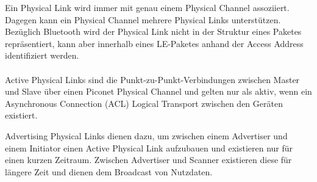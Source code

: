 Ein Physical Link wird immer mit genau einem Physical Channel assoziiert. Dagegen kann ein Physical Channel mehrere Physical Links unterstützen. Bezüglich Bluetooth wird der Physical Link nicht in der Struktur eines Paketes repräsentiert, kann aber innerhalb eines LE-Paketes anhand der Access Address identifiziert werden. \cite{BtSpec4.0_164}
\\\\
Active Physical Links sind die Punkt-zu-Punkt-Verbindungen zwischen Master und Slave über einen Piconet Physical Channel und gelten nur als aktiv, wenn ein Asynchronous Connection (ACL) Logical Transport zwischen den Geräten existiert. \cite{BtSpec4.0_166-167}

Advertising Physical Links dienen dazu, um zwischen einem Advertiser und einem Initiator einen Active Physical Link aufzubauen und existieren nur für einen kurzen Zeitraum. Zwischen Advertiser und Scanner existieren diese für längere Zeit und dienen dem Broadcast von Nutzdaten. \cite{BtSpec4.0_166-167}